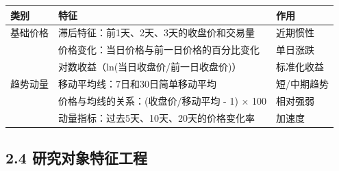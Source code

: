 \documentclass[
  letterpaper,
  DIV=11,
  numbers=noendperiod]{scrartcl}
\begin{document}
\begin{longtable}[]{@{}
  >{\raggedright\arraybackslash}p{}
  >{\raggedright\arraybackslash}p{}
  >{\raggedright\arraybackslash}p{}@{}}
\toprule\noalign{}
\begin{minipage}[b]{\linewidth}\raggedright
类别
\end{minipage} & \begin{minipage}[b]{\linewidth}\raggedright
特征
\end{minipage} & \begin{minipage}[b]{\linewidth}\raggedright
作用
\end{minipage} \\
\midrule\noalign{}
\endhead
\bottomrule\noalign{}
\endlastfoot
基础价格 & 滞后特征：前1天、2天、3天的收盘价和交易量 & 近期惯性 \\
& 价格变化：当日价格与前一日价格的百分比变化 & 单日涨跌 \\
& 对数收益（ln(当日收盘价/前一日收盘价)） & 标准化收益 \\
趋势动量 & 移动平均线：7日和30日简单移动平均 & 短/中期趋势 \\
& 价格与均线的关系：(收盘价/移动平均 - 1) × 100 & 相对强弱 \\
& 动量指标：过去5天、10天、20天的价格变化率 & 加速度 \\
\end{longtable}

\subsection{2.4
研究对象特征工程}\label{ux7814ux7a76ux5bf9ux8c61ux7279ux5f81ux5de5ux7a0b-1}
\end{document}
